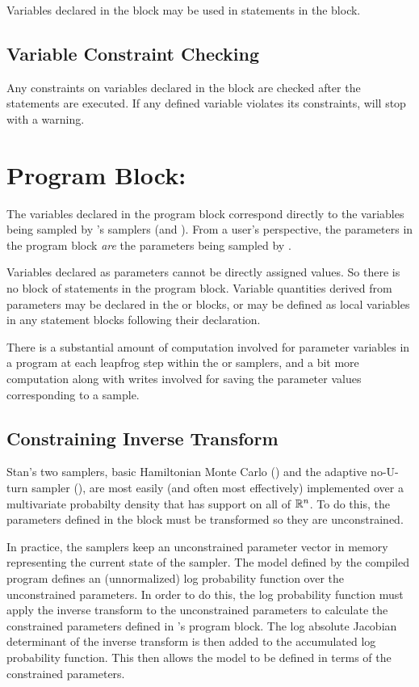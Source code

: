Variables declared in the  block may be used in statements
in the  block.

\subsection{Variable Constraint Checking}

Any constraints on variables declared in the 
block are checked after the statements are executed.  If any defined
variable violates its constraints, \Stan will stop with a warning.


\section{Program Block: }

The variables declared in the  program block
correspond directly to the variables being sampled by \Stan's samplers
(\HMC and \NUTS).  From a user's perspective, the parameters in the
program block \emph{are} the parameters being sampled by \Stan.  

Variables declared as parameters cannot be directly assigned values.
So there is no block of statements in the  program
block.  Variable quantities derived from parameters may be declared in
the  or  blocks,
or may be defined as local variables in any statement blocks following
their declaration.

There is a substantial amount of computation involved for parameter
variables in a \Stan program at each leapfrog step within the
\HMC or \NUTS samplers, and a bit more computation along with writes
involved for saving the parameter values corresponding to a sample.

\subsection{Constraining Inverse Transform}

Stan's two samplers, basic Hamiltonian Monte Carlo (\HMC) and the
adaptive no-U-turn sampler (\NUTS), are most easily (and often most
effectively) implemented over a multivariate probabilty density that
has support on all of $\mathbb{R}^n$.  To do this, the parameters
defined in the  block must be transformed so they are
unconstrained. 

In practice, the samplers keep an unconstrained parameter vector in
memory representing the current state of the sampler.  The model
defined by the compiled \Stan program defines an (unnormalized) log
probability function over the unconstrained parameters.  In order to
do this, the log probability function must apply the inverse transform
to the unconstrained parameters to calculate the constrained
parameters defined in \Stan's  program block.  The
log absolute Jacobian determinant of the inverse transform is then
added to the accumulated log probability function.  This then allows
the \Stan model to be defined in terms of the constrained parameters.

